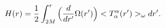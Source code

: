\begin{equation}
H(r)=\frac{1}{2}\int^r_{2M}
\Big({{d\over{dr^\prime}}
\Omega(r^\prime)}\Big)<T^\alpha_\alpha(r^\prime)>_{\omega} dr^\prime.
\label{6d}\end{equation}

